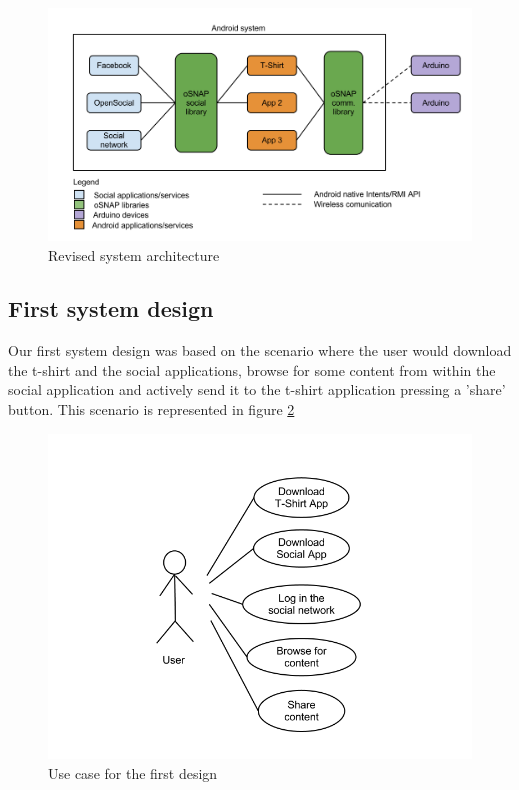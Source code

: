 \begin{figure}[h!]
\centering \includegraphics[scale=0.35]{img/architecture-toplevel.png}
\caption{Revised system architecture}
\label{fig:architecture-toplevel}
\end{figure}

\newpage

\subsection{First system design}
Our first system design was based on the scenario where the user would download the t-shirt
and the social applications, browse for some content from within the social application
and actively send it to the t-shirt application pressing a 'share' button.
This scenario is represented in figure \ref{fig:use-case1}

\begin{figure}[h!]
\centering \includegraphics[scale=0.35]{img/architecture-usecase1.png}
\caption{Use case for the first design}
\label{fig:use-case1}
\end{figure}

